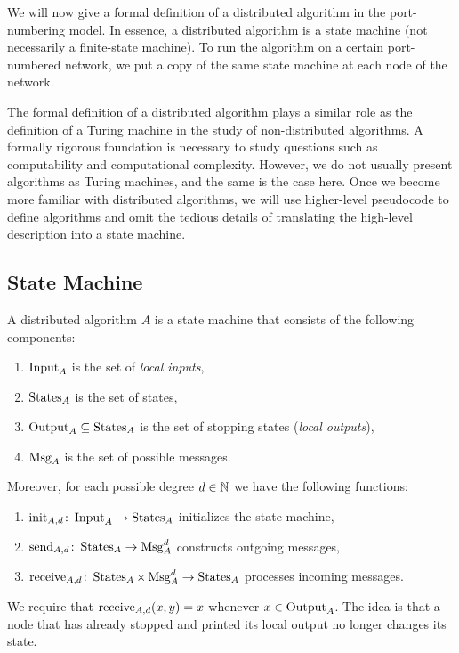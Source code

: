 We will now give a formal definition of a distributed algorithm in the port-numbering model. In essence, a distributed algorithm is a state machine (not necessarily a finite-state machine). To run the algorithm on a certain port-numbered network, we put a copy of the same state machine at each node of the network.

The formal definition of a distributed algorithm plays a similar role as the definition of a Turing machine in the study of non-distributed algorithms. A formally rigorous foundation is necessary to study questions such as computability and computational complexity. However, we do not usually present algorithms as Turing machines, and the same is the case here. Once we become more familiar with distributed algorithms, we will use higher-level pseudocode to define algorithms and omit the tedious details of translating the high-level description into a state machine.

\subsection{State Machine}

A distributed algorithm $A$ is a state machine that consists of the following components:
\begin{enumerate}[label=(\roman*)]
    \item $\operatorname{Input}_A$ is the set of \emph{local inputs},
    \item $\operatorname{States}_A$ is the set of states,
    \item $\operatorname{Output}_A \subseteq \operatorname{States}_A$ is the set of stopping states (\emph{local outputs}),
    \item $\operatorname{Msg}_A$ is the set of possible messages.
\end{enumerate}
Moreover, for each possible degree $d \in \mathbb{N}$ we have the following functions:
\begin{enumerate}[resume*]
    \item $\operatorname{init}_{A,d} \colon \operatorname{Input}_A \to \operatorname{States}_A$ initializes the state machine,
    \item $\operatorname{send}_{A,d} \colon \operatorname{States}_A \to \operatorname{Msg}_A^d$ constructs outgoing messages,
    \item $\operatorname{receive}_{A,d} \colon \operatorname{States}_A \times \operatorname{Msg}_A^d \to \operatorname{States}_A$ processes incoming messages.
\end{enumerate}
We require that $\operatorname{receive}_{A,d}(x,y) = x$ whenever $x \in \operatorname{Output}_A$. The idea is that a node that has already stopped and printed its local output no longer changes its state.

